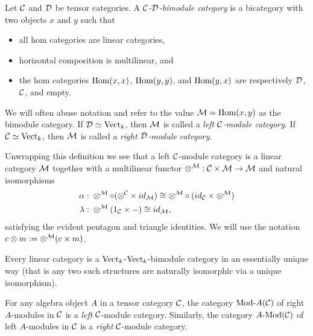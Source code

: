 \documentclass{amsart}
\begin{document}
\begin{definition}
	Let $\mathcal C$ and $\mathcal D$ be tensor categories. A {\em $\mathcal C$-$\mathcal D$-bimodule category} is a bicategory with two objects $x$ and $y$ such that
	\begin{itemize}
		\item all hom categories are linear categories, 
		\item horizontal composition is multilinear, and
		\item the hom categories $\operatorname{Hom}(x,x)$, $\operatorname{Hom}(y,y)$, and $\operatorname{Hom}(y,x)$ are respectively $\mathcal D$, $\mathcal C$, and empty.
	\end{itemize}
	We will often abuse notation and refer to the value $\mathcal M = \operatorname{Hom}(x,y)$ as the bimodule category. If $\mathcal D \simeq \mathrm{Vect}_k$, then $\mathcal M$ is called a {\em left $\mathcal C$-module category}. If $\mathcal C \simeq \mathrm{Vect}_k$, then $\mathcal M$ is called a {\em right $\mathcal D$-module category}.
\end{definition}
	
Unwrapping this definition we see that a left $\mathcal C$-module category is a linear category $\mathcal M$ together with a multilinear functor $\otimes^{\mathcal M}: \mathcal C \times \mathcal M \to \mathcal M$ and natural isomorphisms
	\begin{align*}
		\alpha: & \;    \otimes^{\mathcal M} \circ (\otimes^{\mathcal C} \times id_{\mathcal M}) \cong  \otimes^{\mathcal M} \circ (id_{\mathcal C} \times \otimes^{\mathcal M}) \\
		\lambda: & \; \otimes^{\mathcal M}(1_{\mathcal C} \times -) \cong id_{\mathcal M},
	\end{align*}
	satisfying the evident pentagon and triangle identities.  We will use the notation $c \otimes m := \otimes^\mathcal M(c \times m)$.

\begin{example}
	Every linear category is a $\mathrm{Vect}_k$-$\mathrm{Vect}_k$-bimodule category in an essentially unique way (that is any two such structures are naturally isomorphic via a unique isomorphism). %
\end{example}

\begin{example} \label{ex:ModulesAreModules}
	For any algebra object $A$ in a tensor category $\mathcal C$, the category $\Mod{}{A}(\cC)$ of right $A$-modules in $\mathcal C$ is a \emph{left} $\mathcal C$-module category.  Similarly, the category $\Mod{A}{}(\cC)$ of left $A$-modules in $\mathcal C$ is a \emph{right} $\mathcal C$-module category.
\end{example} 
\end{document}
